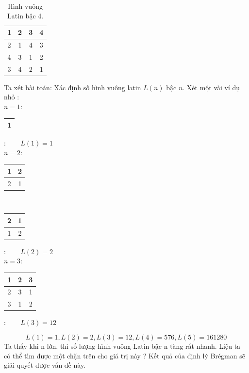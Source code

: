 \documentclass[a4paper, 12pt]{report}
\begin{document}
\begin{table}[ht]
\centering
\begin{tabular}{|c|c|c|c|}
    \hline
     1&2&3&4  \\ \hline
     2&1&4&3  \\ \hline
     4&3&1&2  \\ \hline
     3&4&2&1  \\
     \hline
\end{tabular}
\caption{Hình vuông Latin bậc 4.}
\end{table}%

Ta xét bài toán: Xác định số hình vuông latin $L(n)$ bậc $n$. Xét một vài ví dụ nhỏ :\\
$n=1$:
\begin{tabular}{|c|}
    \hline
     1 \\ \hline
    
\end{tabular}: ~~~ $L(1) = 1$
\vspace{20pt}
\\
$n=2$:
\begin{tabular}{|c|c|}
    \hline
     1&2 \\ \hline
     2&1 \\ 
     \hline
\end{tabular} ~~~ \begin{tabular}{|c|c|}
    \hline
     2&1 \\ \hline
     1&2 \\ 
     \hline
\end{tabular}: ~~~ $L(2) = 2$
\vspace{20pt}
\\
$n=3$:
\begin{tabular}{|c|c|c|}
	\hline
	1&2&3 \\ \hline
	2&3&1 \\ \hline
	3&1&2 \\
	\hline
\end{tabular}: ~~~ $L(3) = 12$

\begin{equation*}
L(1) = 1, L(2) = 2, L(3) = 12, L(4) = 576, L(5) = 161280
\end{equation*}
Ta thấy khi n lớn, thì số lượng hình vuông Latin bậc n tăng rất nhanh. Liệu ta có thể tìm được một chặn trên cho giá trị này ? Kết quả của định lý Brégman sẽ giải quyết được vấn đề này.
\end{document}
